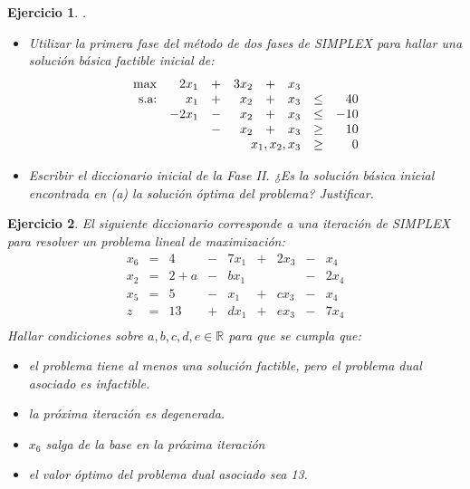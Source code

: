 \documentclass[a4paper,oneside,12pt]{amsart}
\newtheorem{quest}{Ejercicio}
\begin{document}
\begin{quest}{\tiny .}



\begin{itemize}
    \item[(a)] Utilizar la primera fase del método de dos fases de SIMPLEX para  hallar una solución básica factible inicial de:
    \[\begin{array}{rrrrrrrr}
        \max & 2x_1 & + & 3x_2 & + & x_3  \\
        \text{s.a:} & x_1 & + & x_2 & + & x_3 & \leq & 40 \\
          & -2x_1 & - & x_2 & + & x_3 & \leq & -10 \\
          &   & - & x_2 & + & x_3 & \geq & 10 \\
         & \multicolumn{5}{r}{x_1,x_2,x_3} & \geq & 0
    \end{array}
    \]
    
    \item[(b)] Escribir el diccionario inicial de la Fase II. ¿Es la solución básica inicial encontrada en (a) la solución óptima del problema? Justificar. 
 
\end{itemize}

\end{quest}


\begin{quest}
El siguiente diccionario corresponde a una iteración de SIMPLEX para resolver un problema lineal de maximización:
\[
\begin{array}{rrrrrrrrr}
    x_6 & = & 4 & - & 7x_1 & + & 2x_3 & - & x_4  \\
    x_2 & = & 2+a & - & bx_1 &  & & - & 2x_4  \\
    x_5 & = & 5 & - & x_1 & + & cx_3 & - & x_4  \\ \hline
    z & = & 13 & + & dx_1 & + & ex_3 & - & 7x_4  \\
\end{array}
\]
Hallar condiciones sobre $a,b,c,d,e\in\mathbb{R}$ para que se cumpla que:
\begin{itemize}
    \item[(a)] el problema tiene al menos una solución factible, pero el problema dual asociado es infactible.
    \item[(b)] la próxima iteración es degenerada.
    \item[(c)] $x_6$ salga de la base en la próxima iteración
    \item[(d)] el valor óptimo del problema dual asociado sea 13.
\end{itemize}
\end{quest}
\end{document}
